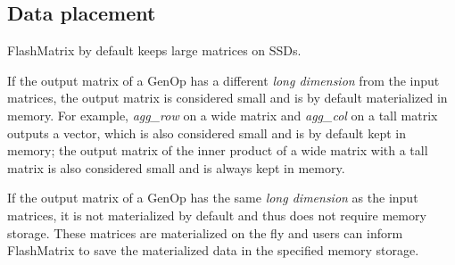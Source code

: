 
\subsection{Data placement}
FlashMatrix by default keeps large matrices on SSDs.

If the output matrix of a GenOp has a different \textit{long dimension} from
the input matrices, the output matrix is considered small and is by default
materialized in memory. For example, \textit{agg\_row} on a wide matrix and
\textit{agg\_col} on a tall matrix outputs a vector, which is also considered
small and is by default kept in memory; the output matrix of the inner product
of a wide matrix with a tall matrix is also considered small and is always
kept in memory.

If the output matrix of a GenOp has the same \textit{long dimension} as
the input matrices, it is not materialized by default and thus does not require
memory storage. These matrices are materialized on the fly and users can inform
FlashMatrix to save the materialized data in the specified memory storage.
